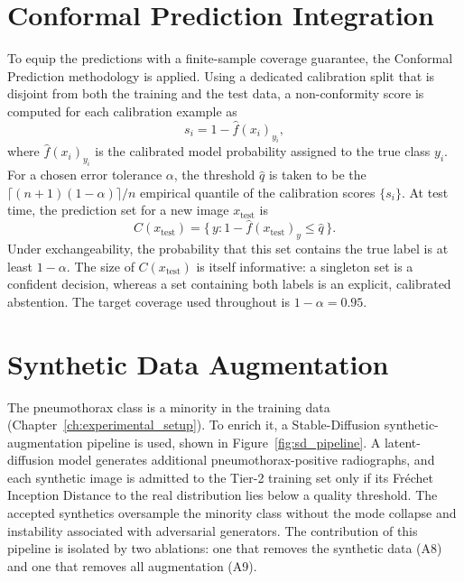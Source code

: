 \section{Conformal Prediction Integration}
\label{sec:conformal}
To equip the predictions with a finite-sample coverage guarantee, the Conformal Prediction methodology \cite{vovk2005algorithmic, shafer2008tutorial} is applied. Using a dedicated calibration split that is disjoint from both the training and the test data, a non-conformity score is computed for each calibration example as
\begin{equation}
    s_i = 1 - \hat{f}(x_i)_{y_i},
\end{equation}
where $\hat{f}(x_i)_{y_i}$ is the calibrated model probability assigned to the true class $y_i$. For a chosen error tolerance $\alpha$, the threshold $\hat{q}$ is taken to be the $\lceil (n+1)(1-\alpha) \rceil / n$ empirical quantile of the calibration scores $\{s_i\}$. At test time, the prediction set for a new image $x_{\text{test}}$ is
\begin{equation}
    C(x_{\text{test}}) = \{\, y : 1 - \hat{f}(x_{\text{test}})_y \le \hat{q} \,\}.
\end{equation}
Under exchangeability, the probability that this set contains the true label is at least $1-\alpha$. The size of $C(x_{\text{test}})$ is itself informative: a singleton set is a confident decision, whereas a set containing both labels is an explicit, calibrated abstention. The target coverage used throughout is $1-\alpha = 0.95$.

\section{Synthetic Data Augmentation}
\label{sec:synthetic}
The pneumothorax class is a minority in the training data (Chapter~\ref{ch:experimental_setup}). To enrich it, a Stable-Diffusion synthetic-augmentation pipeline is used, shown in Figure~\ref{fig:sd_pipeline}. A latent-diffusion model \cite{rombach2022high} generates additional pneumothorax-positive radiographs, and each synthetic image is admitted to the Tier-2 training set only if its Fr\'echet Inception Distance to the real distribution lies below a quality threshold. The accepted synthetics oversample the minority class without the mode collapse and instability associated with adversarial generators. The contribution of this pipeline is isolated by two ablations: one that removes the synthetic data (A8) and one that removes all augmentation (A9).

